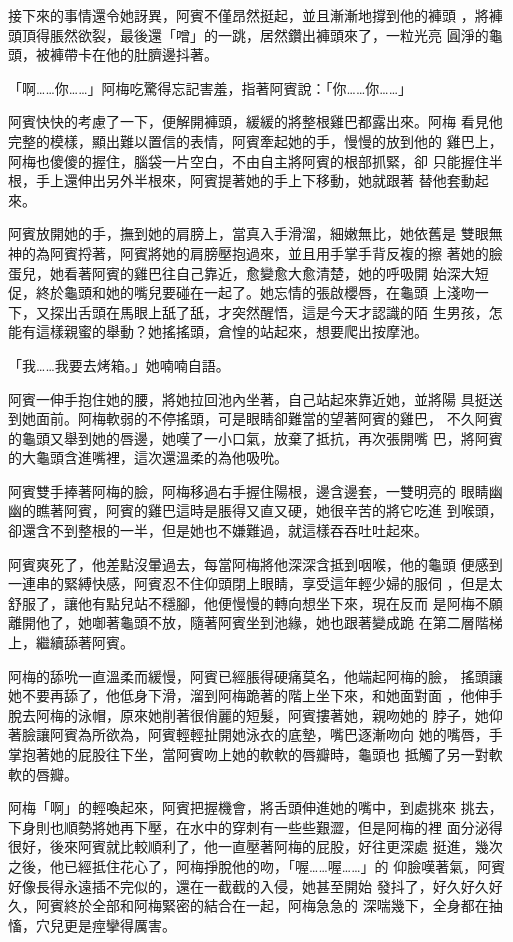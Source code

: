 接下來的事情還令她訝異，阿賓不僅昂然挺起，並且漸漸地撐到他的褲頭
，將褲頭頂得脹然欲裂，最後還「噌」的一跳，居然鑽出褲頭來了，一粒光亮
圓淨的龜頭，被褲帶卡在他的肚臍邊抖著。

「啊……你……」阿梅吃驚得忘記害羞，指著阿賓說：「你……你……」

阿賓快快的考慮了一下，便解開褲頭，緩緩的將整根雞巴都露出來。阿梅
看見他完整的模樣，顯出難以置信的表情，阿賓牽起她的手，慢慢的放到他的
雞巴上，阿梅也傻傻的握住，腦袋一片空白，不由自主將阿賓的根部抓緊，卻
只能握住半根，手上還伸出另外半根來，阿賓提著她的手上下移動，她就跟著
替他套動起來。

阿賓放開她的手，撫到她的肩膀上，當真入手滑溜，細嫩無比，她依舊是
雙眼無神的為阿賓捋著，阿賓將她的肩膀壓抱過來，並且用手掌手背反複的擦
著她的臉蛋兒，她看著阿賓的雞巴往自己靠近，愈變愈大愈清楚，她的呼吸開
始深大短促，終於龜頭和她的嘴兒要碰在一起了。她忘情的張啟櫻唇，在龜頭
上淺吻一下，又探出舌頭在馬眼上舐了舐，才突然醒悟，這是今天才認識的陌
生男孩，怎能有這樣親蜜的舉動？她搖搖頭，倉惶的站起來，想要爬出按摩池。

「我……我要去烤箱。」她喃喃自語。

阿賓一伸手抱住她的腰，將她拉回池內坐著，自己站起來靠近她，並將陽
具挺送到她面前。阿梅軟弱的不停搖頭，可是眼睛卻難當的望著阿賓的雞巴，
不久阿賓的龜頭又舉到她的唇邊，她嘆了一小口氣，放棄了抵抗，再次張開嘴
巴，將阿賓的大龜頭含進嘴裡，這次還溫柔的為他吸吮。

阿賓雙手捧著阿梅的臉，阿梅移過右手握住陽根，邊含邊套，一雙明亮的
眼睛幽幽的瞧著阿賓，阿賓的雞巴這時是脹得又直又硬，她很辛苦的將它吃進
到喉頭，卻還含不到整根的一半，但是她也不嫌難過，就這樣吞吞吐吐起來。

阿賓爽死了，他差點沒暈過去，每當阿梅將他深深含抵到咽喉，他的龜頭
便感到一連串的緊縛快感，阿賓忍不住仰頭閉上眼睛，享受這年輕少婦的服伺
，但是太舒服了，讓他有點兒站不穩腳，他便慢慢的轉向想坐下來，現在反而
是阿梅不願離開他了，她啣著龜頭不放，隨著阿賓坐到池緣，她也跟著變成跪
在第二層階梯上，繼續舔著阿賓。

阿梅的舔吮一直溫柔而緩慢，阿賓已經脹得硬痛莫名，他端起阿梅的臉，
搖頭讓她不要再舔了，他低身下滑，溜到阿梅跪著的階上坐下來，和她面對面
，他伸手脫去阿梅的泳帽，原來她削著很俏麗的短髮，阿賓摟著她，親吻她的
脖子，她仰著臉讓阿賓為所欲為，阿賓輕輕扯開她泳衣的底墊，嘴巴逐漸吻向
她的嘴唇，手掌抱著她的屁股往下坐，當阿賓吻上她的軟軟的唇瓣時，龜頭也
抵觸了另一對軟軟的唇瓣。

阿梅「啊」的輕喚起來，阿賓把握機會，將舌頭伸進她的嘴中，到處挑來
挑去，下身則也順勢將她再下壓，在水中的穿刺有一些些艱澀，但是阿梅的裡
面分泌得很好，後來阿賓就比較順利了，他一直壓著阿梅的屁股，好往更深處
挺進，幾次之後，他已經抵住花心了，阿梅掙脫他的吻，「喔……喔……」的
仰臉嘆著氣，阿賓好像長得永遠插不完似的，還在一截截的入侵，她甚至開始
發抖了，好久好久好久，阿賓終於全部和阿梅緊密的結合在一起，阿梅急急的
深喘幾下，全身都在抽慉，穴兒更是痙攣得厲害。

